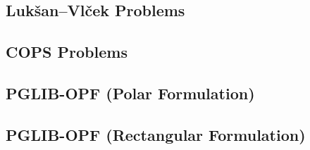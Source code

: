 \documentclass[11pt]{article}
\begin{document}
\subsection{Luk\v{s}an--Vl\v{c}ek Problems}
\label{app:tables:lv}
{\footnotesize

}

\subsection{COPS Problems}
\label{app:tables:cops}
{\footnotesize

}

\subsection{PGLIB-OPF (Polar Formulation)}
\label{app:tables:opf-polar}
{\footnotesize

}

\subsection{PGLIB-OPF (Rectangular Formulation)}
\label{app:tables:opf-rect}
{\footnotesize

}
\end{document}
